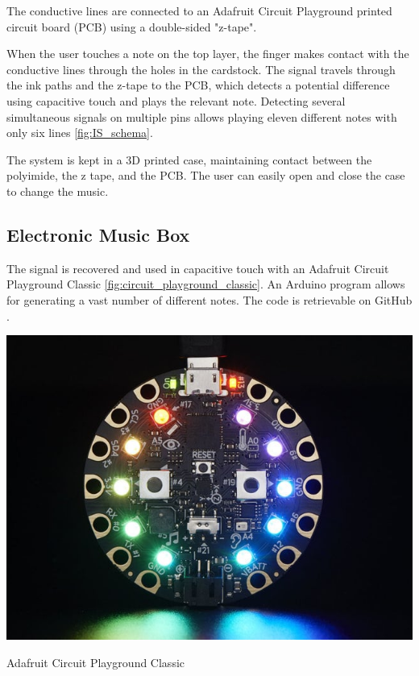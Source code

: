 The conductive lines are connected to an Adafruit Circuit Playground printed circuit board (PCB) using a double-sided "z-tape".

When the user touches a note on the top layer, the finger makes contact with the conductive lines through the holes in the cardstock.
The signal travels through the ink paths and the z-tape to the PCB, which detects a potential difference using capacitive touch and plays the relevant note. Detecting several simultaneous signals on multiple pins allows playing eleven different notes with only six lines \ref{fig:IS_schema}.

The system is kept in a 3D printed case, maintaining contact between the polyimide, the z tape, and the PCB. The user can easily open and close the case to change the music.



\subsection{Electronic Music Box}

The signal is recovered and used in capacitive touch with an Adafruit Circuit Playground Classic \ref{fig:circuit_playground_classic}. An Arduino program allows for generating a vast number of different notes. The code is retrievable on GitHub \cite{adrien2022capacitive_to_notes}.

\begin{marginfigure}
   \centering
   \includegraphics{images/circuit_playground_classic.jpg}
   \caption{Adafruit Circuit Playground Classic}
   \label{fig:circuit_playground_classic}
\end{marginfigure}


